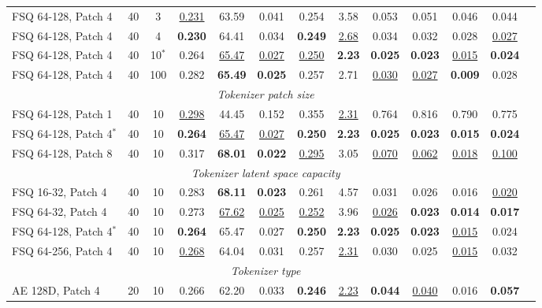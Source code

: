 \begin{table}[h]
{\begin{tabular}{l cc | cccc cccccc}
    FSQ 64-128, Patch 4 & 40 & 3 & \underline{0.231} & 63.59 & 0.041 & 0.254 & 3.58 & 0.053 & 0.051 & 0.046 & 0.044 \\
    FSQ 64-128, Patch 4 & 40 & 4 & \textbf{0.230} & 64.41 & 0.034 & \textbf{0.249} & \underline{2.68} & 0.034 & 0.032 & 0.028 & \underline{0.027} \\
    FSQ 64-128, Patch 4 & 40 & 10$^*$ & 0.264 & \underline{65.47} & \underline{0.027} & \underline{0.250} & \textbf{2.23} & \textbf{0.025} & \textbf{0.023} & \underline{0.015} & \textbf{0.024} \\
    FSQ 64-128, Patch 4 & 40 & 100 & 0.282 & \textbf{65.49} & \textbf{0.025} & 0.257 & 2.71 & \underline{0.030} & \underline{0.027} & \textbf{0.009} & 0.028 \\
    \midrule
    \multicolumn{12}{c}{\textit{Tokenizer patch size}} \\
    \midrule
    FSQ 64-128, Patch 1 & 40 & 10 & \underline{0.298} & 44.45 & 0.152 & 0.355 & \underline{2.31} & 0.764 & 0.816 & 0.790 & 0.775 \\
    FSQ 64-128, Patch 4$^*$ & 40 & 10 & \textbf{0.264} & \underline{65.47} & \underline{0.027} & \textbf{0.250} & \textbf{2.23} & \textbf{0.025} & \textbf{0.023} & \textbf{0.015} & \textbf{0.024} \\
    FSQ 64-128, Patch 8 & 40 & 10 & 0.317 & \textbf{68.01} & \textbf{0.022} & \underline{0.295} & 3.05 & \underline{0.070} & \underline{0.062} & \underline{0.018} & \underline{0.100} \\
    \midrule
    \multicolumn{12}{c}{\textit{Tokenizer latent space capacity}} \\
    \midrule
    FSQ 16-32, Patch 4 & 40 & 10 & 0.283 & \textbf{68.11} & \textbf{0.023} & 0.261 & 4.57 & 0.031 & 0.026 & 0.016 & \underline{0.020} \\
    FSQ 64-32, Patch 4 & 40 & 10 & 0.273 & \underline{67.62} & \underline{0.025} & \underline{0.252} & 3.96 & \underline{0.026} & \textbf{0.023} & \textbf{0.014} & \textbf{0.017} \\
    FSQ 64-128, Patch 4$^*$ & 40 & 10 & \textbf{0.264} & 65.47 & 0.027 & \textbf{0.250} & \textbf{2.23} & \textbf{0.025} & \textbf{0.023} & \underline{0.015} & 0.024 \\
    FSQ 64-256, Patch 4 & 40 & 10 & \underline{0.268} & 64.04 & 0.031 & 0.257 & \underline{2.31} & 0.030 & 0.025 & \underline{0.015} & 0.032 \\
    \midrule
    \multicolumn{12}{c}{\textit{Tokenizer type}} \\
    \midrule
    AE 128D, Patch 4 & 20 & 10 & 0.266 & 62.20 & 0.033 & \textbf{0.246} & \underline{2.23} & \textbf{0.044} & \underline{0.040} & 0.016 & \textbf{0.057} \\

\end{tabular}}
\end{table}

